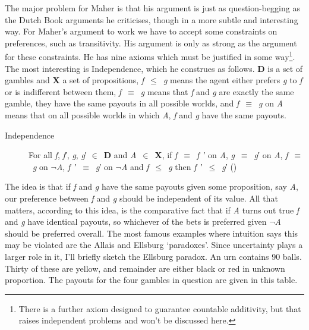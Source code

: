 \documentclass[
  10pt,
  letterpaper,
  DIV=11,
  numbers=noendperiod,
  twoside]{scrartcl}
\begin{document}
The major problem for Maher is that his argument is just as
question-begging as the Dutch Book arguments he criticises, though in a
more subtle and interesting way. For Maher's argument to work we have to
accept some constraints on preferences, such as transitivity. His
argument is only as strong as the argument for these constraints. He has
nine axioms which must be justified in some way\footnote{There is a
  further axiom designed to guarantee countable additivity, but that
  raises independent problems and won't be discussed here.}. The most
interesting is Independence, which he construes as follows. \textbf{D}
is a set of gambles and \textbf{X} a set of propositions,
\emph{f}~\({\leq}\)~\emph{g} means the agent either prefers \emph{g} to
\emph{f} or is indifferent between them, \emph{f}~\({\equiv}\)~\emph{g}
means that \emph{f} and \emph{g} are exactly the same gamble, they have
the same payouts in all possible worlds, and
\emph{f}~\({\equiv}\)~\emph{g} on \emph{A} means that on all possible
worlds in which \emph{A}, \emph{f} and \emph{g} have the same payouts.

\begin{description}
\item[Independence]
For all \emph{f}, \emph{f}′, \emph{g}, \emph{g}′ \({\in}\)~\textbf{D}
and \emph{A}~\({\in}\)~\textbf{X}, if \emph{f}~\({\equiv}\)~\emph{f}~′
on \emph{A}, \emph{g}~\({\equiv}\)~\emph{g}′ on \emph{A},
\emph{f}~\({\equiv}\)~\emph{g} on \({\lnot}\)\emph{A},
\emph{f}~′~\({\equiv}\)~\emph{g}′ on \({\lnot}\)\emph{A} and
\emph{f}~\({\leq}\)~\emph{g} then \emph{f}~′~\({\leq}\)~\emph{g}′
()
\end{description}

The idea is that if \emph{f} and \emph{g} have the same payouts given
some proposition, say \emph{A}, our preference between \emph{f} and
\emph{g} should be independent of its value. All that matters, according
to this idea, is the comparative fact that if \emph{A} turns out true
\emph{f} and \emph{g} have identical payouts, so whichever of the bets
is preferred given \({\lnot}\)\emph{A} should be preferred overall. The
most famous examples where intuition says this may be violated are the
Allais and Ellsburg `paradoxes'. Since uncertainty plays a larger role
in it, I'll briefly sketch the Ellsburg paradox. An urn contains 90
balls. Thirty of these are yellow, and remainder are either black or red
in unknown proportion. The payouts for the four gambles in question are
given in this table.
\end{document}
